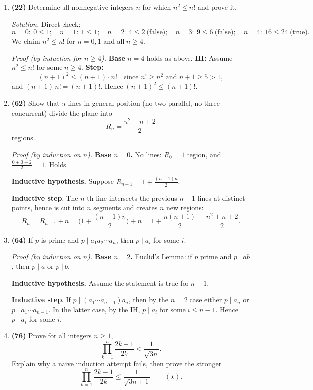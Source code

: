 \documentclass[11pt]{article}
\begin{document}
\begin{enumerate}[label=\textbf{\arabic*.}]
\bigskip

\item \textbf{(22)} Determine all nonnegative integers $n$ for which $n^2\le n!$ and prove it.

\textit{Solution.} Direct check:
\[
n=0:\ 0\le 1;\quad
n=1:\ 1\le 1;\quad
n=2:\ 4\le 2\ \text{(false)};\quad
n=3:\ 9\le 6\ \text{(false)};\quad
n=4:\ 16\le 24\ \text{(true)}.
\]
We claim $n^2\le n!$ for $n=0,1$ and all $n\ge4$.

\textit{Proof (by induction for $n\ge4$).}
\textbf{Base $n=4$} holds as above.
\textbf{IH:} Assume $n^2\le n!$ for some $n\ge4$.
\textbf{Step:}
\[
(n+1)^2 \le (n+1)\cdot n! \quad\text{since } n!\ge n^2 \text{ and } n+1\ge 5>1,
\]
and $(n+1)\,n!=(n+1)!$. Hence $(n+1)^2\le (n+1)!$. 

\bigskip

\item \textbf{(62)} Show that $n$ lines in general position (no two parallel, no three concurrent) divide the plane into
\[
R_n=\frac{n^2+n+2}{2}
\]
regions.

\textit{Proof (by induction on $n$).}
\textbf{Base $n=0$.} No lines: $R_0=1$ region, and $\frac{0+0+2}{2}=1$. Holds.

\textbf{Inductive hypothesis.} Suppose $R_{n-1}=1+\frac{(n-1)n}{2}$.

\textbf{Inductive step.} The $n$-th line intersects the previous $n-1$ lines at distinct points, hence is cut into $n$ segments and creates $n$ new regions:
\[
R_n=R_{n-1}+n
= \Big(1+\frac{(n-1)n}{2}\Big)+n
=1+\frac{n(n+1)}{2}
=\frac{n^2+n+2}{2}.
\]


\bigskip

\item \textbf{(64)} If $p$ is prime and $p\mid a_1a_2\cdots a_n$, then $p\mid a_i$ for some $i$.

\textit{Proof (by induction on $n$).}
\textbf{Base $n=2$.} Euclid’s Lemma: if $p$ prime and $p\mid ab$, then $p\mid a$ or $p\mid b$.

\textbf{Inductive hypothesis.} Assume the statement is true for $n-1$.

\textbf{Inductive step.} If $p\mid (a_1\cdots a_{n-1})a_n$, then by the $n=2$ case either $p\mid a_n$ or $p\mid a_1\cdots a_{n-1}$. In the latter case, by the IH, $p\mid a_i$ for some $i\le n-1$. Hence $p\mid a_i$ for some $i$. 

\bigskip

\item \textbf{(76)} Prove for all integers $n\ge1$,
\[
\prod_{k=1}^{n}\frac{2k-1}{2k} < \frac{1}{\sqrt{3n}}.
\]
Explain why a naive induction attempt fails, then prove the stronger
\[
\prod_{k=1}^{n}\frac{2k-1}{2k} \le \frac{1}{\sqrt{3n+1}}\qquad(\star).
\]


\end{enumerate}
\end{document}
